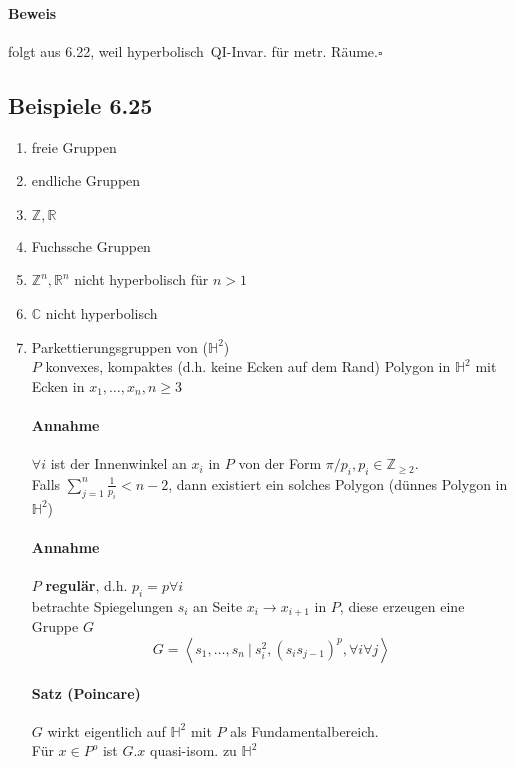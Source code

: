\documentclass{article}
\newcommand{\df}[1]{\textbf{#1}\index{#1}}
\newcommand{\Z}{\mathbb{Z}}
\newcommand{\R}{\mathbb{R}}
\newcommand{\C}{\mathbb{C}}
\renewcommand{\H}{\mathbb{H}}
\newcommand{\grp}[2]{\left\langle #1~|~#2 \right\rangle}
\newcommand{\qed}{\hfill $\square$}
\begin{document}
\paragraph{Beweis} folgt aus 6.22, weil \grqq hyperbolisch\glqq\ QI-Invar. für metr. Räume.\qed

\subsection{Beispiele 6.25}
\begin{enumerate}
	\item freie Gruppen
	\item endliche Gruppen
	\item $\Z, \R$
	\item Fuchssche Gruppen
	\item $\Z^n, \R^n$ nicht hyperbolisch für $n > 1$
	\item $\C$ nicht hyperbolisch
	
	\item Parkettierungsgruppen von ($\H^2$)\\
	$P$ konvexes, kompaktes (d.h. keine Ecken auf dem Rand) Polygon in $\H^2$ mit Ecken in $x_1, \ldots, x_n, n\geq 3$\\
	\paragraph{Annahme} $\forall i$ ist der Innenwinkel an $x_i$ in $P$ von der Form $\pi/p_i, p_i \in \Z_{\geq 2}$.\\
	Falls $\sum_{j=1}^n \frac{1}{p_i} < n - 2$, dann existiert ein solches Polygon (dünnes Polygon in $\H^2$)\\
	\paragraph{Annahme} $P$ \df{regulär}, d.h. $p_i = p \forall i$\\
	betrachte Spiegelungen $s_i$ an Seite $x_i \rightarrow x_{i+1}$ in $P$, diese erzeugen eine Gruppe $G$\\
	\[G = \grp{s_1, \ldots, s_n}{s_i^2, (s_is_{j-1})^{p}, \forall i \forall j }\]
	
	\paragraph{Satz (Poincare)}
	$G$ wirkt eigentlich  auf $\H^2$ mit $P$ als Fundamentalbereich.\\
	Für $x \in P^o$ ist $G.x$ quasi-isom. zu $\H^2$
\end{enumerate}
\end{document}
